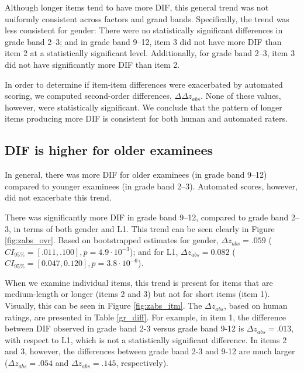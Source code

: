 \documentclass [PhD] {uclathes}
\begin{document}
Although longer items tend to have more DIF, this general trend was not uniformly consistent across factors and grand bands. Specifically, the trend was less consistent for gender: There were no statistically significant differences in grade band 2–3; and in grade band 9–12, item 3 did not have more DIF than item 2 at a statistically significant level. Additionally, for grade band 2–3, item 3 did not have significantly more DIF than item 2.

In order to determine if item-item differences were exacerbated by automated scoring, we computed second-order differences, $\Delta \Delta z_{abs}$. None of these values, however, were statistically significant. We conclude that the pattern of longer items producing more DIF is consistent for both human and automated raters. 

\subsection{DIF is higher for older examinees}

In general, there was more DIF for older examinees (in grade band 9–12) compared to younger examinees (in grade band 2–3). Automated scores, however, did not exacerbate this trend.

There was significantly more DIF in grade band 9–12, compared to grade band 2–3, in terms of both gender and L1. This trend can be seen clearly in Figure \ref{fig:zabs_ovr}. Based on bootstrapped estimates for gender, $\Delta z_{abs} = .059$ ($CI_{95\%} = [.011, .100], p = 4.9 \cdot 10^{-3}$); and for L1, $\Delta z_{abs} = 0.082$ ($CI_{95\%} = [0.047, 0.120], p = 3.8 \cdot 10^{-6}$). 

When we examine individual items, this trend is present for items that are medium-length or longer (items 2 and 3) but not for short items (item 1). Visually, this can be seen in Figure \ref{fig:zabs_itm}. The $\Delta z_{abs}$, based on human ratings, are presented in Table \ref{gr_diff}. For example, in item 1, the difference between DIF observed in grade band 2-3 versus grade band 9-12 is $\Delta z_{abs} = .013$, with respect to L1, which is not a statistically significant difference. In items 2 and 3, however, the differences between grade band 2-3 and 9-12 are much larger ($\Delta z_{abs} = .054$ and $\Delta z_{abs} = .145$, respectively). 
\end{document}
